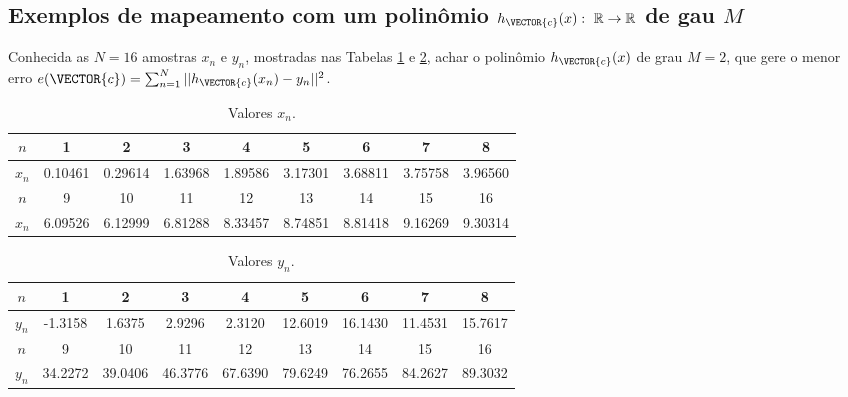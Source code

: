 \subsection{Exemplos de mapeamento com um polinômio
$h_{\VECTOR{c}}(x):~\mathbb{R} \rightarrow \mathbb{R}$ de gau $M$ }

\begin{example}\label{ex:theo:maphxr1r1}
Conhecida as $N=16$ amostras $x_n$ e $y_n$, mostradas nas  Tabelas \ref{table:theo:maphxr1r1:xn} e \ref{table:theo:maphxr1r1:yn},
achar o polinômio $h_{\VECTOR{c}}(x)$ de grau $M=2$, 
que gere o menor erro $e(\VECTOR{c}) =  \sum_{n=1}^{N} ||h_{\VECTOR{c}}(x_n)-y_n||^2$.
\end{example}


\begin{table}[h!]
\centering
\begin{tabular}{|c|c|c|c|c|c|c|c|c|} 
 \hline
$n$   & 1 & 2 & 3 & 4 & 5 & 6 & 7 & 8\\ \hline
$x_n$ & 0.10461 & 0.29614 & 1.63968 & 1.89586 & 3.17301 & 3.68811 & 3.75758 & 3.96560 \\ \hline
 \hline
$n$   & 9 & 10 & 11 & 12 & 13 & 14 & 15 & 16\\  \hline
$x_n$ & 6.09526 & 6.12999 & 6.81288 & 8.33457 & 8.74851 & 8.81418 & 9.16269 & 9.30314 \\ \hline
\end{tabular}
\caption{Valores $x_n$.}
\label{table:theo:maphxr1r1:xn}
\end{table}

\begin{table}[h!]
\centering
\begin{tabular}{|c|c|c|c|c|c|c|c|c|} 
 \hline
$n$   & 1 & 2 & 3 & 4 & 5 & 6 & 7 & 8\\ \hline
$y_n$ & -1.3158 & 1.6375 & 2.9296 & 2.3120 & 12.6019 & 16.1430 & 11.4531 & 15.7617  \\ \hline
 \hline
$n$   & 9 & 10 & 11 & 12 & 13 & 14 & 15 & 16\\  \hline
$y_n$ & 34.2272 & 39.0406 & 46.3776 & 67.6390 & 79.6249 & 76.2655 & 84.2627 & 89.3032 \\ \hline
\end{tabular}
\caption{Valores $y_n$.}
\label{table:theo:maphxr1r1:yn}
\end{table}

